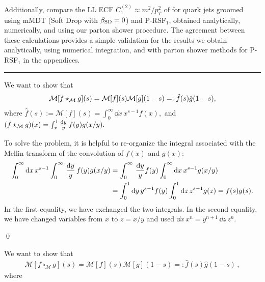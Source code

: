 Additionally,  compare the LL ECF \(C_1^{(2)} \approx m^2 / p_T^2\) of  for quark jets groomed using mMDT (Soft Drop with \(\beta_{\rm SD} = 0\)) and P-RSF\(_1\), obtained analytically, numerically, and using our parton shower procedure.
%
The agreement between these calculations provides a simple validation for the results we obtain analytically, using numerical integration, and with parton shower methods for P-RSF\(_1\) in the appendices.




\vspace{10pt}
\hrule
\vspace{10pt}



We want to show that
\begin{align}
    \mathcal M[f \star_{\mathcal M} g](s) = \mathcal M[f](s) \mathcal M[g](1-s)
    =: \hat{f}(s) \hat{g}(1-s)
    ,
\end{align}
where
\(
    \hat{f}(s) := \mathcal{M}[f](s) = \int_0^\infty \dd x\, x^{s-1} f(x)
    ,
\)
and
\(
    (f \star_{\mathcal M} g)(x)
    =
    \int_x^1 \frac{\dd y}{y}\, f(y) g(x/y)
    .
\)

To solve the problem, it is helpful to re-organize the integral associated with the Mellin transform of the convolution of \(f(x)\) and \(g(x)\):
\begin{align}
    \int_0^\infty \dd x\, x^{s-1}
    \int_0^\infty \,\frac{\dd y}{y}\,
    f(y) g(x/y)
    &=
    \int_0^\infty \,\frac{\dd y}{y}
    f(y)
    \int_0^\infty \dd x\,
    x^{s-1} g(x/y)
    \\
    \notag
    &=
    \int_0^1 \dd y \, y^{s-1} f(y)
    \int_0^1 \dd z\, z^{s-1} g(z)
    =
    f(s) g(s)
    .
\end{align}
In the first equality, we have exchanged the two integrals. %
%
In the second equality, we have changed variables from \(x\) to \(z = x/y\) and used \(\dd x\, x^n = y^{n+1}\, \dd z\, z^n\).

\qed{}


We want to show that
\begin{align}
    \mathcal M[f \circ_{\mathcal M} g](s) = \mathcal M[f](s) \mathcal M[g](1-s)
    =:
    \hat{f}(s) \hat{g}(1-s)
    \,,
\end{align}
where

